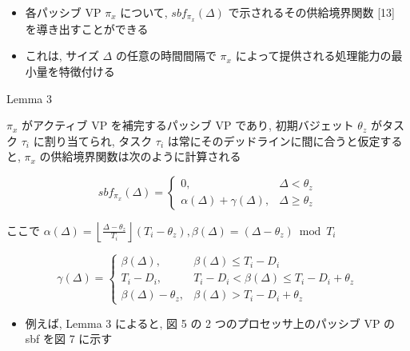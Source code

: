\begin{frame}{}
    \begin{itemize}
        \item 各パッシブ VP $\pi_{x}$ について, $s b f_{\pi_{x}}(\Delta)$ で示されるその供給境界関数 [13] を導き出すことができる
\item これは, サイズ $\Delta$ の任意の時間間隔で $\pi_{x}$ によって提供される処理能力の最小量を特徴付ける
    \end{itemize}
\end{frame}

\begin{frame}[label=lemma3]{Lemma 3}
    \begin{lemma}[]
        $\pi_{x}$ がアクティブ VP を補完するパッシブ VP であり, 初期バジェット $\theta_{z}$ がタスク $\tau_{i}$ に割り当てられ, タスク $\tau_{i}$ は常にそのデッドラインに間に合うと仮定すると, $\pi_{x}$ の供給境界関数は次のように計算される

        \begin{equation*}
            s b f_{\pi_{x}}(\Delta)= \begin{cases}0, & \Delta<\theta_{z} \\ \alpha(\Delta)+\gamma(\Delta), & \Delta \geq \theta_{z}\end{cases}
        \end{equation*}

        ここで $\alpha(\Delta)=\left\lfloor\frac{\Delta-\theta_{z}}{T_{i}}\right\rfloor\left(T_{i}-\theta_{z}\right), \beta(\Delta)=\left(\Delta-\theta_{z}\right) \bmod T_{i}$

        \begin{equation*}
            \gamma(\Delta)=\left\{\begin{array}{lr}
                \beta(\Delta),            & \beta(\Delta) \leq T_{i}-D_{i}                        \\
                T_{i}-D_{i},              & T_{i}-D_{i}<\beta(\Delta) \leq T_{i}-D_{i}+\theta_{z} \\
                \beta(\Delta)-\theta_{z}, & \beta(\Delta)>T_{i}-D_{i}+\theta_{z}
            \end{array}\right.
        \end{equation*}
    \end{lemma}
\end{frame}

\begin{frame}{}
    \begin{itemize}
        \item 例えば, Lemma 3 によると, 図 5 の 2 つのプロセッサ上のパッシブ VP の sbf を図 7 に示す
    \end{itemize}
\end{frame}

